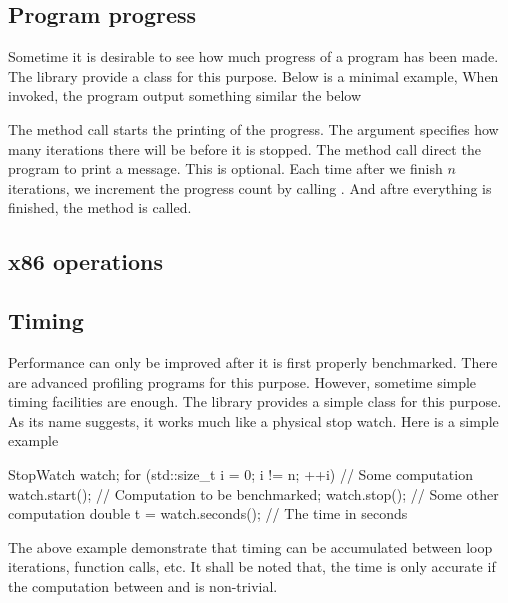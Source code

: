 \documentclass[11pt,bib,mint,hyper,altcolor]{marticle}
\begin{document}
\subsection{Program progress}
\label{sub:Program progress}

Sometime it is desirable to see how much progress of a program has been made.
The library provide a  class for this purpose. Below is a
minimal example,
When invoked, the program output something similar the below
The method call  starts the printing of the
progress. The argument specifies how many iterations there will be before it is
stopped. The method call  direct the
program to print a message. This is optional. Each time after we finish $n$
iterations, we increment the progress count by calling
. And aftre everything is finished, the method
 is called.

\subsection{x86 \protect\simd operations}
\label{sub:x86 SIMD operations}

\subsection{Timing}
\label{sub:Timing}

Performance can only be improved after it is first properly benchmarked. There
are advanced profiling programs for this purpose. However, sometime simple
timing facilities are enough. The library provides a simple class
 for this purpose. As its name suggests, it works much
like a physical stop watch. Here is a simple example
\begin{cppcode}
  StopWatch watch;
  for (std::size_t i = 0; i != n; ++i) {
      // Some computation
      watch.start();
      // Computation to be benchmarked;
      watch.stop();
      // Some other computation
  }
  double t = watch.seconds(); // The time in seconds
\end{cppcode}
The above example demonstrate that timing can be accumulated between loop
iterations, function calls, etc. It shall be noted that, the time is only
accurate if the computation between  and
 is non-trivial.

\printbibliography[title=\refname]
\end{document}
